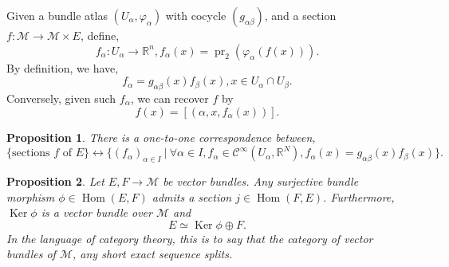 \documentclass[8pt]{article}
\newtheorem{proposition}{Proposition}[section]
\DeclareMathOperator{\pr}{pr}
\DeclareMathOperator{\Hom}{Hom}
\DeclareMathOperator{\Ker}{Ker}
\newcommand{\R}[0]{\mathbb{R}}
\newcommand{\M}[0]{\mathcal{M}}
\newcommand{\sep}[0]{\:|\:}
\begin{document}

Given a bundle atlas $(U_\alpha,\varphi_\alpha)$ with cocycle $(g_{\alpha\beta})$, and a section $f:\M\to \M\times E$, define,
\begin{equation*}
  f_\alpha:U_\alpha \to \R^n, f_\alpha(x) =\pr_2(\varphi_\alpha(f(x))).
\end{equation*}
By definition, we have,
\begin{equation*}
  f_\alpha = g_{\alpha\beta}(x)f_\beta(x), x\in U_\alpha\cap U_\beta.
\end{equation*}
Conversely, given such $f_\alpha$, we can recover $f$ by
\begin{equation*}
f(x) = [(\alpha,x,f_\alpha(x))].
\end{equation*}

\begin{proposition}
  \label{proposition_9_8}
  There is a one-to-one correspondence between,
  \begin{equation*}
    \{\text{sections $f$ of $E$}\}\leftrightarrow\{(f_\alpha)_{\alpha\in I}\sep \forall \alpha\in I, f_\alpha\in\mathcal{C}^\infty (U_\alpha,\R^N), f_\alpha(x)=g_{\alpha\beta}(x)f_\beta(x)\}.
  \end{equation*}
\end{proposition}
\begin{proposition}
  \label{proposition_9_9}
  Let $E,F\to\M$ be vector bundles. Any surjective bundle morphism $\phi\in\Hom(E,F)$ admits a section $j\in \Hom(F,E)$. Furthermore, $\Ker\phi$ is a vector bundle over $\M$ and 
  \begin{equation*}
    E\simeq \Ker\phi\oplus F.
  \end{equation*}
  In the language of category theory, this is to say that the category of vector bundles of $\M$, any short exact sequence splits.
  \begin{center}
  \end{center}
\end{proposition}
\end{document}
